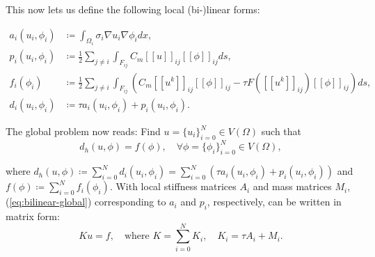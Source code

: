This now lets us define the following local (bi-)linear forms:

\begin{equation}
\label{eq:bilinear-forms}
\begin{split}
    a_i(u_i, \phi_i) & \coloneqq \int_{\Omega_i} \sigma_i \nabla u_i \nabla \phi_i dx, \\
    p_i(u_i, \phi_i) & \coloneqq \frac{1}{2} \sum_{j \neq i} \int_{F_{ij}} C_m [\![u]\!]_{ij}[\![\phi]\!]_{ij} ds, \\
    f_i(\phi_i) & \coloneqq \frac{1}{2} \sum_{j \neq i} \int_{F_{ij}} (C_m [\![u^k]\!]_{ij}[\![\phi]\!]_{ij} - \tau F([\![u^k]\!]_{ij})[\![\phi]\!]_{ij}) ds, \\
    d_i(u_i, \phi_i) & \coloneqq \tau a_i(u_i, \phi_i) + p_i(u_i, \phi_i).
\end{split}
\end{equation}

The global problem now reads: Find $u = \{u_i\}_{i=0}^N \in V(\Omega)$ such that
\begin{equation} \label{eq:bilinear-global}
    d_h(u, \phi) = f(\phi), \quad \forall \phi = \{\phi_i\}_{i=0}^N \in V(\Omega),
\end{equation}

where $d_h(u, \phi) \coloneqq \sum_{i=0}^Nd_i(u_i,\phi_i) = \sum_{i=0}^N(\tau a_i(u_i,\phi_i) + p_i(u_i,\phi_i))$ and $f(\phi) \coloneqq \sum_{i=0}^Nf_i(\phi_i)$. With local stiffness matrices $A_i$ and mass matrices $M_i$, (\ref{eq:bilinear-global}) corresponding to $a_i$ and $p_i$, respectively, can be written in matrix form:
\begin{equation} \label{eq:matrix-form}
    Ku=f, \quad \text{where } K = \sum_{i=0}^NK_i, \quad K_i = \tau A_i + M_i.
\end{equation}